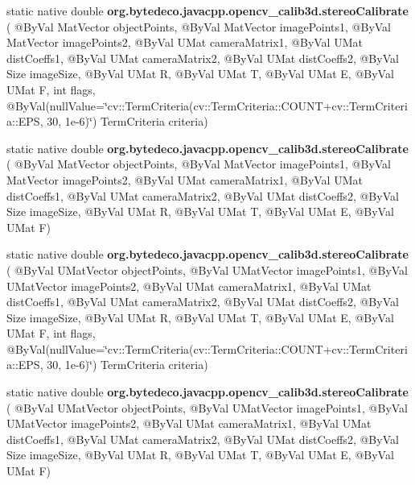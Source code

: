 \begin{DoxyCompactItemize}
\item 
\mbox{\label{group__calib3d_ga8861fdd92e65b3dde8b59d56e7343594}} 
static native double {\bfseries org.\+bytedeco.\+javacpp.\+opencv\+\_\+calib3d.\+stereo\+Calibrate} ( @By\+Val Mat\+Vector object\+Points, @By\+Val Mat\+Vector image\+Points1, @By\+Val Mat\+Vector image\+Points2, @By\+Val U\+Mat camera\+Matrix1, @By\+Val U\+Mat dist\+Coeffs1, @By\+Val U\+Mat camera\+Matrix2, @By\+Val U\+Mat dist\+Coeffs2, @By\+Val Size image\+Size, @By\+Val U\+Mat R, @By\+Val U\+Mat T, @By\+Val U\+Mat E, @By\+Val U\+Mat F, int flags, @By\+Val(null\+Value=\char`\"{}cv\+::\+Term\+Criteria(cv\+::\+Term\+Criteria\+::\+C\+O\+U\+NT+cv\+::\+Term\+Criteria\+::\+E\+PS, 30, 1e-\/6)\char`\"{}) Term\+Criteria criteria)
\item 
\mbox{\label{group__calib3d_gabfdb3f344ac92e3b25c7eabf026a7586}} 
static native double {\bfseries org.\+bytedeco.\+javacpp.\+opencv\+\_\+calib3d.\+stereo\+Calibrate} ( @By\+Val Mat\+Vector object\+Points, @By\+Val Mat\+Vector image\+Points1, @By\+Val Mat\+Vector image\+Points2, @By\+Val U\+Mat camera\+Matrix1, @By\+Val U\+Mat dist\+Coeffs1, @By\+Val U\+Mat camera\+Matrix2, @By\+Val U\+Mat dist\+Coeffs2, @By\+Val Size image\+Size, @By\+Val U\+Mat R, @By\+Val U\+Mat T, @By\+Val U\+Mat E, @By\+Val U\+Mat F)
\item 
\mbox{\label{group__calib3d_gae7c9c14da4d02323463fe8d84971f80c}} 
static native double {\bfseries org.\+bytedeco.\+javacpp.\+opencv\+\_\+calib3d.\+stereo\+Calibrate} ( @By\+Val U\+Mat\+Vector object\+Points, @By\+Val U\+Mat\+Vector image\+Points1, @By\+Val U\+Mat\+Vector image\+Points2, @By\+Val U\+Mat camera\+Matrix1, @By\+Val U\+Mat dist\+Coeffs1, @By\+Val U\+Mat camera\+Matrix2, @By\+Val U\+Mat dist\+Coeffs2, @By\+Val Size image\+Size, @By\+Val U\+Mat R, @By\+Val U\+Mat T, @By\+Val U\+Mat E, @By\+Val U\+Mat F, int flags, @By\+Val(null\+Value=\char`\"{}cv\+::\+Term\+Criteria(cv\+::\+Term\+Criteria\+::\+C\+O\+U\+NT+cv\+::\+Term\+Criteria\+::\+E\+PS, 30, 1e-\/6)\char`\"{}) Term\+Criteria criteria)
\item 
\mbox{\label{group__calib3d_ga692630ef7bb3c54985f578b0549df54c}} 
static native double {\bfseries org.\+bytedeco.\+javacpp.\+opencv\+\_\+calib3d.\+stereo\+Calibrate} ( @By\+Val U\+Mat\+Vector object\+Points, @By\+Val U\+Mat\+Vector image\+Points1, @By\+Val U\+Mat\+Vector image\+Points2, @By\+Val U\+Mat camera\+Matrix1, @By\+Val U\+Mat dist\+Coeffs1, @By\+Val U\+Mat camera\+Matrix2, @By\+Val U\+Mat dist\+Coeffs2, @By\+Val Size image\+Size, @By\+Val U\+Mat R, @By\+Val U\+Mat T, @By\+Val U\+Mat E, @By\+Val U\+Mat F)

\end{DoxyCompactItemize}
